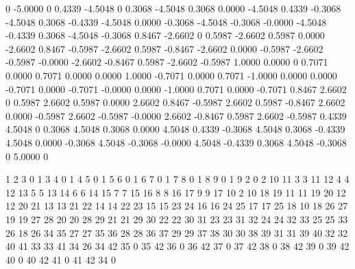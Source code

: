 \begin{minipage}[t]{0.48\textwidth}
 \begin{inputfile}[frame=single, caption={\opt{rr.dat} file created by \opt{tank.m}}, label={file:tank_rr}]
         0   -5.0000         0
    0.4339   -4.5048         0
    0.3068   -4.5048    0.3068
    0.0000   -4.5048    0.4339
   -0.3068   -4.5048    0.3068
   -0.4339   -4.5048    0.0000
   -0.3068   -4.5048   -0.3068
   -0.0000   -4.5048   -0.4339
    0.3068   -4.5048   -0.3068
    0.8467   -2.6602         0
    0.5987   -2.6602    0.5987
    0.0000   -2.6602    0.8467
   -0.5987   -2.6602    0.5987
   -0.8467   -2.6602    0.0000
   -0.5987   -2.6602   -0.5987
   -0.0000   -2.6602   -0.8467
    0.5987   -2.6602   -0.5987
    1.0000    0.0000         0
    0.7071    0.0000    0.7071
    0.0000    0.0000    1.0000
   -0.7071    0.0000    0.7071
   -1.0000    0.0000    0.0000
   -0.7071    0.0000   -0.7071
   -0.0000    0.0000   -1.0000
    0.7071    0.0000   -0.7071
    0.8467    2.6602         0
    0.5987    2.6602    0.5987
    0.0000    2.6602    0.8467
   -0.5987    2.6602    0.5987
   -0.8467    2.6602    0.0000
   -0.5987    2.6602   -0.5987
   -0.0000    2.6602   -0.8467
    0.5987    2.6602   -0.5987
    0.4339    4.5048         0
    0.3068    4.5048    0.3068
    0.0000    4.5048    0.4339
   -0.3068    4.5048    0.3068
   -0.4339    4.5048    0.0000
   -0.3068    4.5048   -0.3068
   -0.0000    4.5048   -0.4339
    0.3068    4.5048   -0.3068
         0    5.0000         0
 \end{inputfile}
\end{minipage} \hspace{10pt}
\begin{minipage}[t]{0.48\textwidth}
  \begin{inputfile}[frame=single, caption={\opt{ee.dat} file created by \opt{tank.m}}, label={file:tank_ee}]
     1     2     3     0
     1     3     4     0
     1     4     5     0
     1     5     6     0
     1     6     7     0
     1     7     8     0
     1     8     9     0
     1     9     2     0
     2    10    11     3
     3    11    12     4
     4    12    13     5
     5    13    14     6
     6    14    15     7
     7    15    16     8
     8    16    17     9
     9    17    10     2
    10    18    19    11
    11    19    20    12
    12    20    21    13
    13    21    22    14
    14    22    23    15
    15    23    24    16
    16    24    25    17
    17    25    18    10
    18    26    27    19
    19    27    28    20
    20    28    29    21
    21    29    30    22
    22    30    31    23
    23    31    32    24
    24    32    33    25
    25    33    26    18
    26    34    35    27
    27    35    36    28
    28    36    37    29
    29    37    38    30
    30    38    39    31
    31    39    40    32
    32    40    41    33
    33    41    34    26
    34    42    35     0
    35    42    36     0
    36    42    37     0
    37    42    38     0
    38    42    39     0
    39    42    40     0
    40    42    41     0
    41    42    34     0
  \end{inputfile}
\end{minipage} \hspace{10pt}



